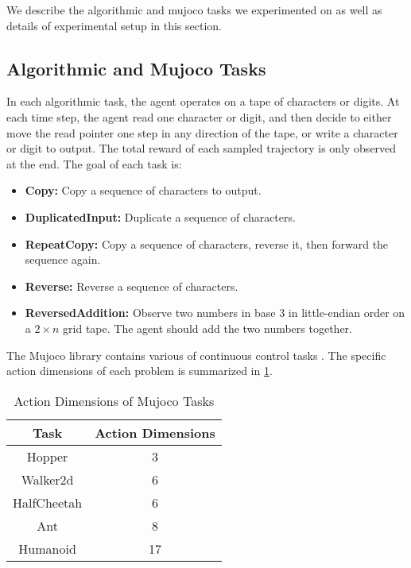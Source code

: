 We describe the algorithmic and mujoco tasks we experimented on as well as details of experimental setup in this section.

\subsection{Algorithmic and Mujoco Tasks}
\label{subsec:benchmarks}
In each algorithmic task, the agent operates on a tape of characters or digits. At each time step, the agent read one character or digit, and then decide to either move the read pointer one step in any direction of the tape, or write a character or digit to output. The total reward of each sampled trajectory is only observed at the end. The goal of each task is:
\begin{itemize}
\item \textbf{Copy:} Copy a sequence of characters to output. 
\item \textbf{DuplicatedInput:} Duplicate a sequence of characters.
\item \textbf{RepeatCopy:} Copy a sequence of characters, reverse it, then forward the sequence again. 
\item \textbf{Reverse:} Reverse a sequence of characters.
\item \textbf{ReversedAddition:} Observe two numbers in base 3 in little-endian order on a $2\times n$ grid tape. The agent should add the two numbers together. 
\end{itemize}

The Mujoco library contains various of continuous control tasks \citep{todorov2012mujoco}. The specific action dimensions of each problem is summarized in \cref{table:mujoco-act-dims}. 

\begin{table}[ht]
\caption{Action Dimensions of Mujoco Tasks} %
\centering 
\begin{tabular}{c c} 
\hline
Task & Action Dimensions \\ [0.5ex] %
\hline %
Hopper & 3  \\ %
Walker2d & 6  \\
HalfCheetah & 6  \\
Ant & 8  \\
Humanoid & 17  \\ [1ex] %
\hline %
\end{tabular}
\label{table:mujoco-act-dims} %
\end{table}


